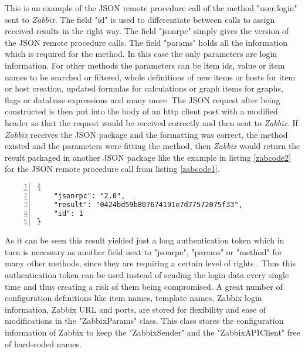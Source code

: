 	This is an example of the JSON remote procedure call of the method "user.login" sent to \textit{Zabbix}. The field "id" is used to differentiate between calls to assign received results in the right way. The field "jsonrpc" simply gives the version of the JSON remote procedure calls. The field "params" holds all the information which is required for the method. In this case the only parameters are login information. For other methods the parameters can be item ids, value or item names to be searched or filtered, whole definitions of new items or hosts for item or host creation, updated formulas for calculations or graph items for graphs, flags or database expressions and many more. The JSON request after being constructed is then put into the body of an http client post with a modified header so that the request would be received correctly and then sent to \textit{Zabbix}. If \textit{Zabbix} receives the JSON package and the formatting was correct, the method existed and the parameters were fitting the method, then \textit{Zabbix} would return the result packaged in another JSON package like the example in listing \ref{zabcode2} for the JSON remote procedure call from listing \ref{zabcode1}.
	\begin{lstlisting}[language=json_sw,caption={JSON authentication response\cite{zab3}},captionpos=b,numbers=left,label=zabcode2]
{
    "jsonrpc": "2.0",
    "result": "0424bd59b807674191e7d77572075f33",
    "id": 1
}
\end{lstlisting}
	As it can be seen this result yielded just a long authentication token which in turn is necessary as another field next to "jsonrpc", "params" or "method" for many other methods, since they are requiring a certain level of rights \cite{zab3}. Thus this authentication token can be used instead of sending the login data every single time and thus creating a risk of them being compromised.
	A great number of configuration definitions like item names, template names, Zabbix login information, Zabbix URL and ports, are stored for flexibility and ease of modifications in the "ZabbixParams" class. This class stores the configuration information of Zabbix to keep the "ZabbixSender" and the "ZabbixAPIClient" free of hard-coded names.
